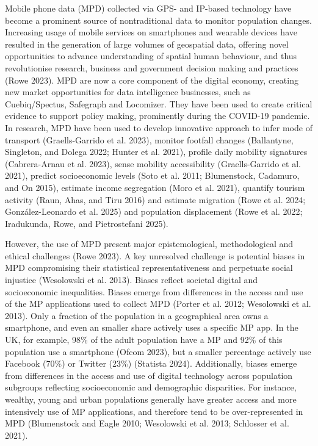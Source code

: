 \documentclass{article}
\begin{document}
Mobile phone data (MPD) collected via GPS- and IP-based technology have
become a prominent source of nontraditional data to monitor population
changes. Increasing usage of mobile services on smartphones and wearable
devices have resulted in the generation of large volumes of geospatial
data, offering novel opportunities to advance understanding of spatial
human behaviour, and thus revolutionise research, business and
government decision making and practices (Rowe 2023). MPD are now
a core component of the digital economy, creating new market
opportunities for data intelligence businesses, such as Cuebiq/Spectus,
Safegraph and Locomizer. They have been used to create critical evidence
to support policy making, prominently during the COVID-19 pandemic. In
research, MPD have been used to develop innovative approach to infer
mode of transport (Graells-Garrido et al. 2023), monitor footfall changes
(Ballantyne, Singleton, and Dolega 2022; Hunter et al. 2021), profile daily mobility signatures
(Cabrera-Arnau et al. 2023), sense mobility accessibility
(Graells-Garrido et al. 2021), predict socioeconomic levels (Soto et al. 2011; Blumenstock, Cadamuro, and On 2015), estimate income segregation (Moro et al. 2021), quantify
tourism activity (Raun, Ahas, and Tiru 2016) and estimate migration (Rowe et al. 2024; González-Leonardo et al. 2025) and population displacement (Rowe et al. 2022; Iradukunda, Rowe, and Pietrostefani 2025).

However, the use of MPD present major epistemological, methodological
and ethical challenges (Rowe 2023). A key unresolved challenge is
potential biases in MPD compromising their statistical
representativeness and perpetuate social injustice
(Wesolowski et al. 2013). Biases reflect societal digital and
socioeconomic inequalities. Biases emerge from differences in the access
and use of the MP applications used to collect MPD
(Porter et al. 2012; Wesolowski et al. 2013). Only a fraction of the population
in a geographical area owns a smartphone, and even an smaller share
actively uses a specific MP app. In the UK, for example, 98\%
of the adult population have a MP and 92\% of this population
use a smartphone (Ofcom 2023), but a smaller percentage actively use
Facebook (70\%) or Twitter (23\%) (Statista 2024). Additionally, biases
emerge from differences in the access and use of digital technology
across population subgroups reflecting socioeconomic and demographic
disparities. For instance, wealthy, young and urban populations
generally have greater access and more intensively use of MP
applications, and therefore tend to be over-represented in MPD
(Blumenstock and Eagle 2010; Wesolowski et al. 2013; Schlosser et al. 2021).
\end{document}
